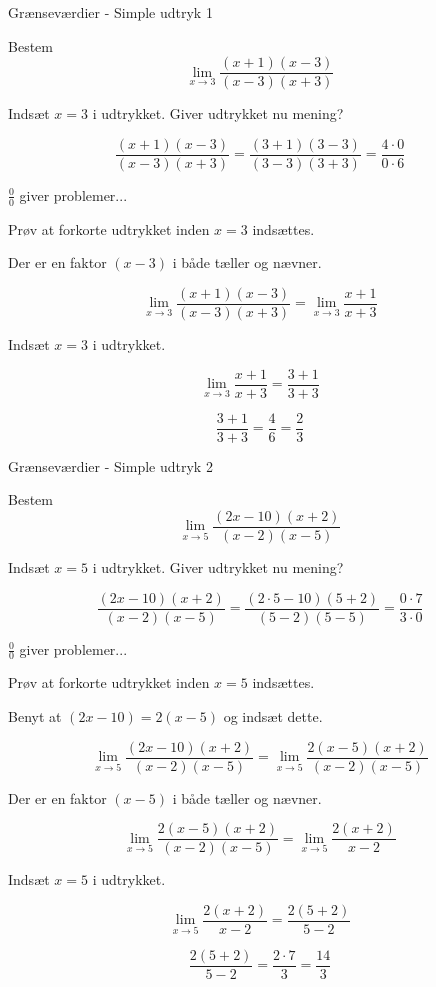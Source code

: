 \documentclass{article}
\begin{document}
\tableofcontents
\newpage

\begin{exercise}{Grænseværdier - Simple udtryk 1}

Bestem
\[
\lim_{x \to 3} \frac{(x + 1)(x - 3)}{(x - 3)(x + 3)}
\]


\hint
Indsæt $x=3$ i udtrykket. Giver udtrykket nu mening?

\hint
\[
\frac{(x + 1)(x - 3)}{(x - 3)(x + 3)} = \frac{(3 + 1)(3 - 3)}{(3 - 3)(3 + 3)} = \frac{4 \cdot 0}{0 \cdot 6}
\]

\hint
$\frac{0}{0}$ giver problemer...

\hint
Prøv at forkorte udtrykket inden $x=3$ indsættes.

\hint
Der er en faktor $(x - 3)$ i både tæller og nævner.

\hint
\[
\lim_{x \to 3} \frac{(x + 1)(x - 3)}{(x - 3)(x + 3)} = \lim_{x \to 3} \frac{x + 1}{x + 3}
\]

\hint
Indsæt $x=3$ i udtrykket.

\hint
\[
\lim_{x \to 3} \frac{x + 1}{x + 3} = \frac{3 + 1}{3 + 3}
\]

\hint
\[
\frac{3 + 1}{3 + 3} = \frac{4}{6} = \frac{2}{3}
\]


\end{exercise}

\newpage
\begin{exercise}{Grænseværdier - Simple udtryk 2}

Bestem
\[
\lim_{x \to 5} \frac{(2x - 10)(x + 2)}{(x - 2)(x - 5)}
\]


\hint
Indsæt $x=5$ i udtrykket. Giver udtrykket nu mening?

\hint
\[
\frac{(2x - 10)(x + 2)}{(x - 2)(x - 5)} = \frac{(2 \cdot 5 - 10)(5 + 2)}{(5 - 2)(5 - 5)} = \frac{0 \cdot 7}{3 \cdot 0}
\]

\hint
$\frac{0}{0}$ giver problemer...

\hint
Prøv at forkorte udtrykket inden $x=5$ indsættes.

\hint
Benyt at $(2x - 10) = 2 (x - 5)$ og indsæt dette.

\hint
\[
\lim_{x \to 5} \frac{(2x - 10)(x + 2)}{(x - 2)(x - 5)} = \lim_{x \to 5} \frac{2(x - 5)(x + 2)}{(x - 2)(x - 5)}
\]

\hint
Der er en faktor $(x - 5)$ i både tæller og nævner.

\hint
\[
\lim_{x \to 5} \frac{2(x - 5)(x + 2)}{(x - 2)(x - 5)} = \lim_{x \to 5} \frac{2(x + 2)}{x - 2}
\]

\hint
Indsæt $x=5$ i udtrykket.

\hint
\[
 \lim_{x \to 5} \frac{2(x + 2)}{x - 2} = \frac{2(5 + 2)}{5 - 2}
\]

\hint
\[
 \frac{2(5 + 2)}{5 - 2} = \frac{2 \cdot 7}{3} = \frac{14}{3}
\]


\end{exercise}
\end{document}
